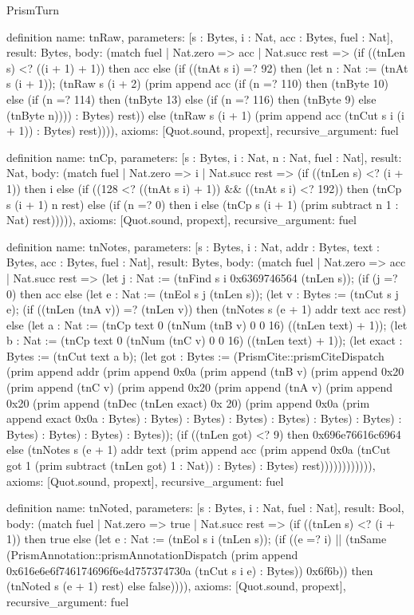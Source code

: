 \begin{lexlean}{PrismTurn}
\begin{semanticmodule}
definition{
  name: tnRaw,
  parameters: [s : Bytes, i : Nat, acc : Bytes, fuel : Nat],
  result: Bytes,
  body: (match fuel
    | Nat.zero => acc
    | Nat.succ rest => (if ((tnLen s) <? ((i + 1) + 1)) then acc else (if ((tnAt s i) =? 92) then (let n : Nat := (tnAt s (i + 1)); (tnRaw s (i + 2) (prim append acc (if (n =? 110) then (tnByte 10) else (if (n =? 114) then (tnByte 13) else (if (n =? 116) then (tnByte 9) else (tnByte n)))) : Bytes) rest)) else (tnRaw s (i + 1) (prim append acc (tnCut s i (i + 1)) : Bytes) rest)))),
  axioms: [Quot.sound, propext],
  recursive_argument: fuel
}

definition{
  name: tnCp,
  parameters: [s : Bytes, i : Nat, n : Nat, fuel : Nat],
  result: Nat,
  body: (match fuel
    | Nat.zero => i
    | Nat.succ rest => (if ((tnLen s) <? (i + 1)) then i else (if ((128 <? ((tnAt s i) + 1)) && ((tnAt s i) <? 192)) then (tnCp s (i + 1) n rest) else (if (n =? 0) then i else (tnCp s (i + 1) (prim subtract n 1 : Nat) rest))))),
  axioms: [Quot.sound, propext],
  recursive_argument: fuel
}

definition{
  name: tnNotes,
  parameters: [s : Bytes, i : Nat, addr : Bytes, text : Bytes, acc : Bytes, fuel : Nat],
  result: Bytes,
  body: (match fuel
    | Nat.zero => acc
    | Nat.succ rest => (let j : Nat := (tnFind s i 0x6369746564 (tnLen s)); (if (j =? 0) then acc else (let e : Nat := (tnEol s j (tnLen s)); (let v : Bytes := (tnCut s j e); (if ((tnLen (tnA v)) =? (tnLen v)) then (tnNotes s (e + 1) addr text acc rest) else (let a : Nat := (tnCp text 0 (tnNum (tnB v) 0 0 16) ((tnLen text) + 1)); (let b : Nat := (tnCp text 0 (tnNum (tnC v) 0 0 16) ((tnLen text) + 1)); (let exact : Bytes := (tnCut text a b); (let got : Bytes := (PrismCite::prismCiteDispatch (prim append addr (prim append 0x0a (prim append (tnB v) (prim append 0x20 (prim append (tnC v) (prim append 0x20 (prim append (tnA v) (prim append 0x20 (prim append (tnDec (tnLen exact) 0x 20) (prim append 0x0a (prim append exact 0x0a : Bytes) : Bytes) : Bytes) : Bytes) : Bytes) : Bytes) : Bytes) : Bytes) : Bytes) : Bytes) : Bytes)); (if ((tnLen got) <? 9) then 0x696e76616c6964 else (tnNotes s (e + 1) addr text (prim append acc (prim append 0x0a (tnCut got 1 (prim subtract (tnLen got) 1 : Nat)) : Bytes) : Bytes) rest)))))))))))),
  axioms: [Quot.sound, propext],
  recursive_argument: fuel
}

definition{
  name: tnNoted,
  parameters: [s : Bytes, i : Nat, fuel : Nat],
  result: Bool,
  body: (match fuel
    | Nat.zero => true
    | Nat.succ rest => (if ((tnLen s) <? (i + 1)) then true else (let e : Nat := (tnEol s i (tnLen s)); (if ((e =? i) || (tnSame (PrismAnnotation::prismAnnotationDispatch (prim append 0x616e6e6f746174696f6e4d757374730a (tnCut s i e) : Bytes)) 0x6f6b)) then (tnNoted s (e + 1) rest) else false)))),
  axioms: [Quot.sound, propext],
  recursive_argument: fuel
}


\end{semanticmodule}
\end{lexlean}
